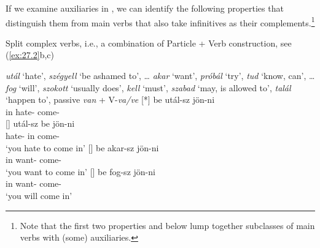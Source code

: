 \documentclass[output=paper]{langsci/langscibook}
\begin{document}
If we examine auxiliaries in , we can identify the following
properties that distinguish them from main verbs that also take infinitives as
their complements.\footnote{Note that the first two properties 
    and  below lump together subclasses of main verbs with (some)
auxiliaries.}\largerpage[-2]

\begin{exe}\label{ex:27.2}
    \ex Split complex verbs, i.e., a combination of Particle + Verb
    construction, see (\ref{ex:27.2}b,c)\footnotemark
    \begin{xlist}
     \emph{utál} ‘hate’, \emph{szégyell} ‘be ashamed to’, \dots{}
     \emph{akar} ‘want’, \emph{próbál} ‘try’, \emph{tud} ‘know, can’,
        \dots{}
     \emph{fog} ‘will’, \emph{szokott} ‘usually does’, \emph{kell}
        ‘must’, \emph{szabad} ‘may, is allowed to’, \emph{talál} ‘happen to’,
        passive \emph{van} + V-\emph{va/ve}
    [*]{%
        \gll    be   utál-sz     jön-ni \\
                in    hate-\Ssg{}  come-\Inf{}\\}
    []{%
        \gll    utál-sz    be jön-ni \\
                hate-\Ssg{}  in   come-\Inf{}\\
        \glt    ‘you hate to come in’}
    []{%
        \gll    be   akar-sz     jön-ni\\
                in    want-\Ssg{}  come-\Inf{}\\
        \glt    ‘you want to come in’}
    []{%
        \gll    be   fog-sz    jön-ni\\
                in    want-\Ssg{}  come-\Inf{}\\
        \glt    ‘you will come in’}
    \end{xlist}
\end{exe}
\end{document}
